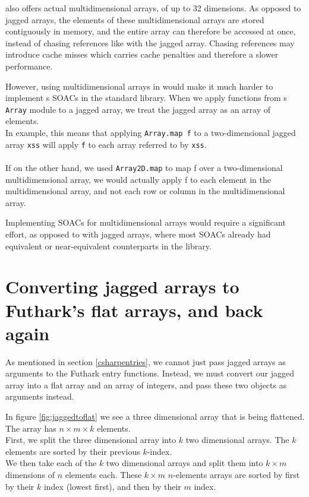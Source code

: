 \fsharp{} also offers actual multidimensional arrays, of up to 32 dimensions.
As opposed to jagged arrays, the elements of these multidimensional arrays are
stored contiguously in memory, and the entire array can therefore be accessed at
once, instead of chasing references like with the jagged array. Chasing
references may introduce cache misses which carries cache penalties and
therefore a slower performance.

However, using multidimensional arrays in \fshark{} would make it much harder to
implement \fshark{}s SOACs in the standard library. 
When we apply functions from \fsharp{}s \texttt{Array} module to a jagged
array, we treat the jagged array as an array of elements.\\
In example, this means that applying \texttt{Array.map f} to a two-dimensional
jagged array \texttt{xss} will apply \texttt{f} to each array referred to by
\texttt{xss}.\\\\
If on the other hand, we used \texttt{Array2D.map} to map f over a
two-dimensional multidimensional array, we would actually apply f to each
element in the multidimensional array, and not each row or column in the
multidimensional array.

Implementing SOACs for multidimensional arrays would require a significant
effort, as opposed to with jagged arrays, where most SOACs already had
equivalent or near-equivalent counterparts in the \fsharp{} library.

\section{Converting jagged arrays to Futhark's flat arrays,  and back again}
\label{sec:convertingarrays}
As mentioned in section \ref{csharpentries}, we cannot just pass jagged arrays
as arguments to the Futhark \csharp{} entry functions.
Instead, we must convert our jagged array into a flat array and an array of
integers, and pass these two objects as arguments instead.

In figure \ref{fig:jaggedtoflat} we see a three dimensional array that is being
flattened. The array has $n \times m \times k$ elements.
\\
First, we split the three dimensional array into $k$ two dimensional arrays. The
$k$ elements are sorted by their previous $k$-index.
\\
We then take each of the $k$ two dimensional arrays and split them into $k
\times m$ dimensions of $n$ elements each.
These $k \times m$ $n$-elements arrays are sorted by first by their $k$ index
(lowest first), and then by their $m$ index.

